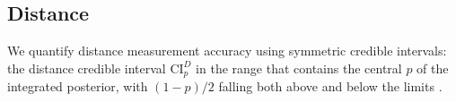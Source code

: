 \subsection{Distance}\label{sec:distance}

We quantify distance measurement accuracy using symmetric credible intervals: the distance credible interval $\mathrm{CI}_p^{D}$ in the range that contains the central $p$ of the integrated posterior, with $(1-p)/2$ falling both above and below the limits \citep{Aasi_2013}. 

